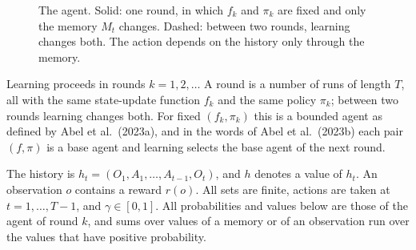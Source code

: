 \documentclass[11pt]{article}
\theoremstyle{definition}
\begin{document}
\begin{figure}[h]
\centering
{}
\caption{The agent. Solid: one round, in which $f_k$ and $\pi_k$ are fixed and only the memory $M_t$ changes. Dashed: between two rounds, learning changes both. The action depends on the history only through the memory.}\label{fig:agent}
\end{figure}

Learning proceeds in rounds $k=1,2,\dots$ A round is a number of runs of length $T$, all with the same state-update function $f_k$ and the same policy $\pi_k$; between two rounds learning changes both. For fixed $(f_k,\pi_k)$ this is a bounded agent as defined by Abel et al.\ (2023a), and in the words of Abel et al.\ (2023b) each pair $(f,\pi)$ is a base agent and learning selects the base agent of the next round.

The history is $h_t=(O_1,A_1,\dots,A_{t-1},O_t)$, and $h$ denotes a value of $h_t$. An observation $o$ contains a reward $r(o)$. All sets are finite, actions are taken at $t=1,\dots,T-1$, and $\gamma\in[0,1]$. All probabilities and values below are those of the agent of round $k$, and sums over values of a memory or of an observation run over the values that have positive probability.
\end{document}
